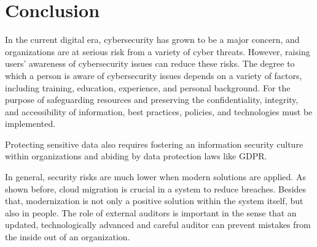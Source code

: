 \documentclass[journal]{IEEEtran}
\begin{document}
\section{Conclusion}
In the current digital era, cybersecurity has grown to be a major concern, and organizations are at serious risk from a variety of cyber threats. However, raising users' awareness of cybersecurity issues can reduce these risks. The degree to which a person is aware of cybersecurity issues depends on a variety of factors, including training, education, experience, and personal background. For the purpose of safeguarding resources and preserving the confidentiality, integrity, and accessibility of information, best practices, policies, and technologies must be implemented.

Protecting sensitive data also requires fostering an information security culture within organizations and abiding by data protection laws like GDPR. 


In general, security risks are much lower when modern solutions are applied. As shown before, cloud migration is crucial in a system to reduce breaches. Besides that, modernization is not only a positive solution within the system itself, but also in people. The role of external auditors is important in the sense that an updated, technologically advanced and careful auditor can prevent mistakes from the inside out of an organization.





%
\end{document}

